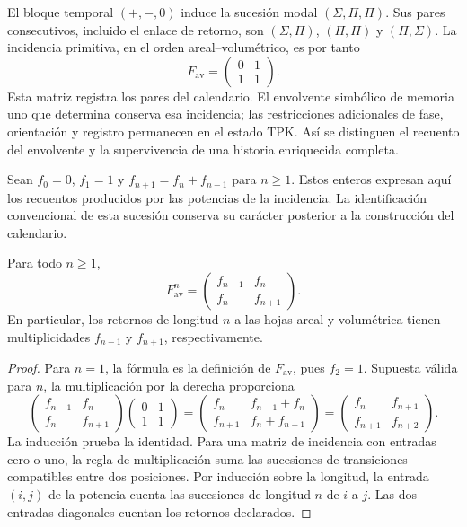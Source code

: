 El bloque temporal \((+,-,0)\) induce la sucesión modal
\((\Sigma,\Pi,\Pi)\). Sus pares consecutivos, incluido el enlace de retorno,
son \((\Sigma,\Pi)\), \((\Pi,\Pi)\) y \((\Pi,\Sigma)\). La incidencia
primitiva, en el orden areal--volumétrico, es por tanto
\begin{equation}
 F_{\mathrm{av}}=
 \begin{pmatrix}0&1\\1&1\end{pmatrix}.
 \label{hrr:incidencia-matriz}
\end{equation}
Esta matriz registra los pares del calendario. El envolvente simbólico
de memoria uno que determina conserva esa incidencia; las restricciones
adicionales de fase, orientación y registro permanecen en el estado TPK.
Así se distinguen el recuento del envolvente y la supervivencia de una
historia enriquecida completa.

Sean \(f_0=0\), \(f_1=1\) y
\(f_{n+1}=f_n+f_{n-1}\) para \(n\geq1\). Estos enteros expresan aquí
los recuentos producidos por las potencias de la incidencia. La
identificación convencional de esta sucesión conserva su carácter
posterior a la construcción del calendario.

\begin{proposition}
\label{hrr:potencias}
Para todo \(n\geq1\),
\begin{equation}
 F_{\mathrm{av}}^n=
 \begin{pmatrix}f_{n-1}&f_n\\f_n&f_{n+1}\end{pmatrix}.
 \label{hrr:potencias-formula}
\end{equation}
En particular, los retornos de longitud \(n\) a las hojas areal y
volumétrica tienen multiplicidades \(f_{n-1}\) y \(f_{n+1}\),
respectivamente.
\end{proposition}
\begin{proof}
Para \(n=1\), la fórmula es la definición de
\(F_{\mathrm{av}}\), pues \(f_2=1\). Supuesta válida para \(n\),
la multiplicación por la derecha proporciona
\[
 \begin{pmatrix}f_{n-1}&f_n\\f_n&f_{n+1}\end{pmatrix}
 \begin{pmatrix}0&1\\1&1\end{pmatrix}
 =\begin{pmatrix}f_n&f_{n-1}+f_n\\
 f_{n+1}&f_n+f_{n+1}\end{pmatrix}
 =\begin{pmatrix}f_n&f_{n+1}\\f_{n+1}&f_{n+2}\end{pmatrix}.
\]
La inducción prueba la identidad. Para una matriz de incidencia con
entradas cero o uno, la regla de multiplicación suma las sucesiones de
transiciones compatibles entre dos posiciones. Por inducción sobre la
longitud, la entrada \((i,j)\) de la potencia cuenta las sucesiones de
longitud \(n\) de \(i\) a \(j\). Las dos entradas diagonales cuentan
los retornos declarados.
\end{proof}

